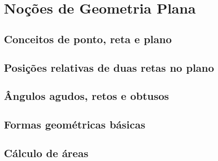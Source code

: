 \chapter{Noções de Geometria Plana}
\section{Conceitos de ponto, reta e plano}
\section{Posições relativas de duas retas no plano}
\section{Ângulos agudos, retos e obtusos}
\section{Formas geométricas básicas}
\section{Cálculo de áreas}